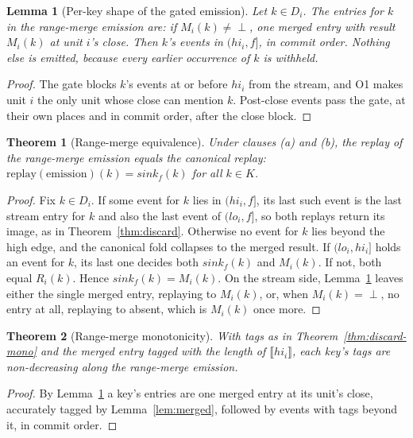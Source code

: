 \documentclass[sigconf,nonacm,10pt]{acmart}
\theoremstyle{plain}
\newtheorem{theorem}{Theorem}
\newtheorem{lemma}{Lemma}[section]
\theoremstyle{definition}
\newcommand{\den}[1]{\llbracket #1 \rrbracket}   %
\newcommand{\window}[2]{(#1,#2]}                 %
\newcommand{\sink}{\mathit{sink}}                %
\newcommand{\keys}{K}                            %
\begin{document}
\begin{lemma}[Per-key shape of the gated emission]\label{lem:rm-shape}
Let $k \in D_i$. The entries for $k$ in the range-merge emission
are: if $M_i(k) \neq \perp$, one merged entry with result
$M_i(k)$ at unit $i$'s close. Then $k$'s events in
$\window{hi_i}{f}$, in commit order. Nothing else is emitted, because every earlier
occurrence of $k$ is withheld.
\end{lemma}

\begin{proof}
The gate blocks $k$'s events at or before $hi_i$ from the stream,
and O1
makes unit $i$ the only unit whose close can mention $k$. Post-close
events pass the gate, at their own places and in commit order,
after the close block.
\end{proof}

\begin{theorem}[Range-merge equivalence]\label{thm:rm}
Under clauses (a) and (b), the replay of the range-merge emission
equals the canonical replay:
$\mathrm{replay}(\text{emission})(k) = \sink_f(k)$ for all
$k \in \keys$.
\end{theorem}

\begin{proof}
Fix $k \in D_i$. If some event for $k$ lies in
$\window{hi_i}{f}$, its last such event is the last stream entry
for $k$ and also the last event of $\window{lo_i}{f}$, so both
replays return its image, as in Theorem~\ref{thm:discard}.
Otherwise no event for $k$ lies beyond the high edge, and the
canonical fold collapses to the merged result. If
$\window{lo_i}{hi_i}$ holds an event for $k$, its last one decides
both $\sink_f(k)$ and $M_i(k)$. If not, both equal $R_i(k)$.
Hence $\sink_f(k) = M_i(k)$. On the stream side,
Lemma~\ref{lem:rm-shape} leaves either the single merged entry,
replaying to $M_i(k)$, or, when $M_i(k) = \perp$, no entry at all,
replaying to absent, which is $M_i(k)$ once more.
\end{proof}

\begin{theorem}[Range-merge monotonicity]\label{thm:rm-mono}
With tags as in Theorem~\ref{thm:discard-mono} and the merged
entry tagged with the length of $\den{hi_i}$, each key's tags are
non-decreasing along the
range-merge emission.
\end{theorem}

\begin{proof}
By Lemma~\ref{lem:rm-shape} a key's entries are one merged entry
at its unit's close, accurately tagged by Lemma~\ref{lem:merged},
followed by
events with tags beyond it, in commit order.
\end{proof}
\end{document}
